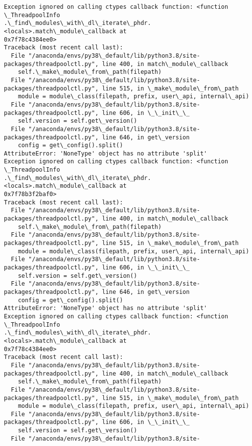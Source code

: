 \documentclass[11pt]{article}
\begin{document}
\begin{Verbatim}[commandchars=\\\{\}]
Exception ignored on calling ctypes callback function: <function \_ThreadpoolInfo
.\_find\_modules\_with\_dl\_iterate\_phdr.<locals>.match\_module\_callback at
0x7f78c4384ee0>
Traceback (most recent call last):
  File "/anaconda/envs/py38\_default/lib/python3.8/site-
packages/threadpoolctl.py", line 400, in match\_module\_callback
    self.\_make\_module\_from\_path(filepath)
  File "/anaconda/envs/py38\_default/lib/python3.8/site-
packages/threadpoolctl.py", line 515, in \_make\_module\_from\_path
    module = module\_class(filepath, prefix, user\_api, internal\_api)
  File "/anaconda/envs/py38\_default/lib/python3.8/site-
packages/threadpoolctl.py", line 606, in \_\_init\_\_
    self.version = self.get\_version()
  File "/anaconda/envs/py38\_default/lib/python3.8/site-
packages/threadpoolctl.py", line 646, in get\_version
    config = get\_config().split()
AttributeError: 'NoneType' object has no attribute 'split'
Exception ignored on calling ctypes callback function: <function \_ThreadpoolInfo
.\_find\_modules\_with\_dl\_iterate\_phdr.<locals>.match\_module\_callback at
0x7f78b3f2baf0>
Traceback (most recent call last):
  File "/anaconda/envs/py38\_default/lib/python3.8/site-
packages/threadpoolctl.py", line 400, in match\_module\_callback
    self.\_make\_module\_from\_path(filepath)
  File "/anaconda/envs/py38\_default/lib/python3.8/site-
packages/threadpoolctl.py", line 515, in \_make\_module\_from\_path
    module = module\_class(filepath, prefix, user\_api, internal\_api)
  File "/anaconda/envs/py38\_default/lib/python3.8/site-
packages/threadpoolctl.py", line 606, in \_\_init\_\_
    self.version = self.get\_version()
  File "/anaconda/envs/py38\_default/lib/python3.8/site-
packages/threadpoolctl.py", line 646, in get\_version
    config = get\_config().split()
AttributeError: 'NoneType' object has no attribute 'split'
Exception ignored on calling ctypes callback function: <function \_ThreadpoolInfo
.\_find\_modules\_with\_dl\_iterate\_phdr.<locals>.match\_module\_callback at
0x7f78c4384ee0>
Traceback (most recent call last):
  File "/anaconda/envs/py38\_default/lib/python3.8/site-
packages/threadpoolctl.py", line 400, in match\_module\_callback
    self.\_make\_module\_from\_path(filepath)
  File "/anaconda/envs/py38\_default/lib/python3.8/site-
packages/threadpoolctl.py", line 515, in \_make\_module\_from\_path
    module = module\_class(filepath, prefix, user\_api, internal\_api)
  File "/anaconda/envs/py38\_default/lib/python3.8/site-
packages/threadpoolctl.py", line 606, in \_\_init\_\_
    self.version = self.get\_version()
  File "/anaconda/envs/py38\_default/lib/python3.8/site-

\end{Verbatim}
\end{document}
